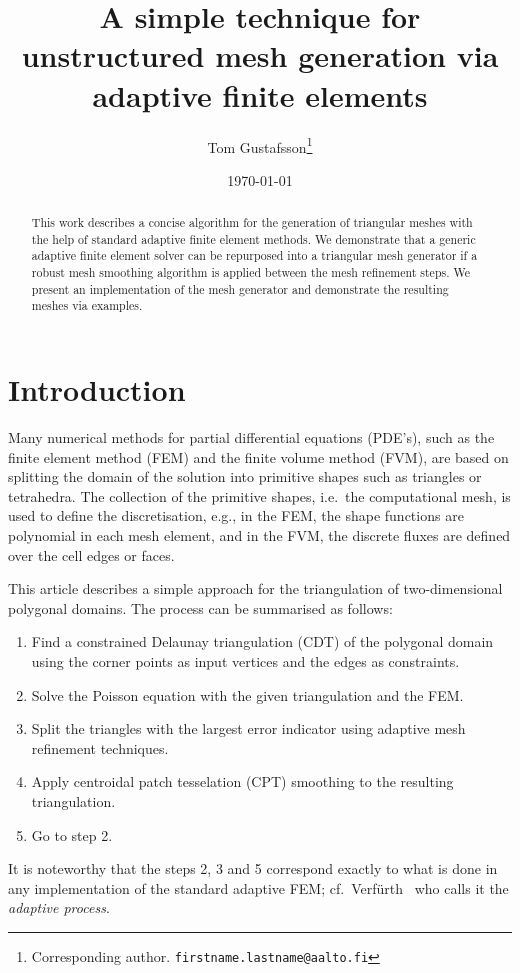 \documentclass[11pt]{article}
\author{Tom Gustafsson\footnote{Corresponding author. \texttt{firstname.lastname@aalto.fi}}}
\date{\today}
\title{A simple technique for unstructured mesh generation via adaptive finite elements}
\begin{document}
\newcommand*\DNA{\textsc{dna}}

\newcommand*\Let[2]{\State #1 $\gets$ #2}
\algrenewcommand{}
\algrenewcommand{}

\maketitle

\begin{abstract}
  This work describes a concise algorithm for the generation of triangular
  meshes with the help of standard adaptive finite element methods.  We
  demonstrate that a generic adaptive finite element solver can be repurposed
  into a triangular mesh generator if a robust mesh smoothing algorithm is
  applied between the mesh refinement steps.  We present an implementation of
  the mesh generator and demonstrate the resulting meshes via examples.
\end{abstract}

\section{Introduction}
\label{sec:orge4667b0}

Many numerical methods for partial differential equations (PDE's), such as the
finite element method (FEM) and the finite volume method (FVM), are based on
splitting the domain of the solution into primitive shapes such as triangles or
tetrahedra.  The collection of the primitive shapes, i.e.~the computational
mesh, is used to define the discretisation, e.g., in the FEM, the shape
functions are polynomial in each mesh element, and in the FVM, the discrete
fluxes are defined over the cell edges or faces.

This article describes a simple approach for the triangulation of
two-dimensional polygonal domains.  The process can be summarised as follows:
\begin{enumerate}
\item Find a constrained Delaunay triangulation (CDT) of the polygonal domain
      using the corner points as input vertices and the edges
      as constraints.
\item Solve the Poisson equation with the given triangulation
      and the FEM.
\item Split
      the triangles with the largest error indicator
      using adaptive mesh refinement techniques.
\item Apply centroidal patch tesselation (CPT) smoothing to the resulting
  triangulation.
\item Go to step 2.
\end{enumerate}
It is noteworthy that the steps 2, 3 and 5 correspond exactly to what is done in
any implementation of the standard adaptive FEM;
cf.~Verf\"{u}rth~\cite{Verf_rth_2013} who calls it the \emph{adaptive process}.
\end{document}
